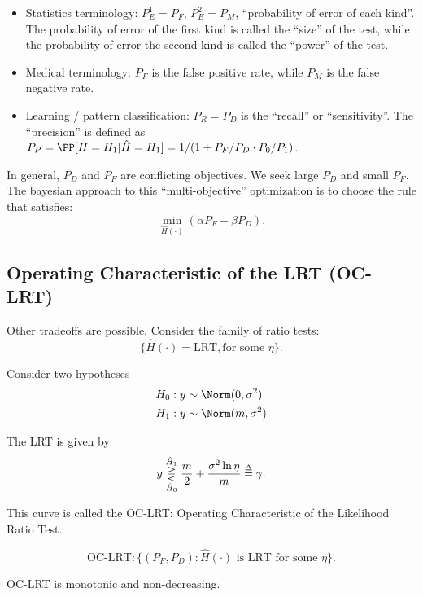 \begin{itemize}
	\item Statistics terminology: $P_E^1 = P_F$, $P_E^2 = P_M$, ``probability of error of each kind''. The probability of error of the first kind is called the ``size'' of the test, while the probability of error the second kind is called the ``power'' of the test. 
	\item Medical terminology: $P_F$ is the false positive rate, while $P_M$ is the false negative rate. 
	\item Learning / pattern classification: $P_R = P_D$ is the ``recall'' or ``sensitivity''. The ``precision'' is defined as $P_P = \PP[H=H_1|\hat{H}=H_1] = 1 / (1 + P_F/P_D\cdot P_0/P_1)$. 
\end{itemize}

In general, $P_D$ and $P_F$ are conflicting objectives. We seek large $P_D$ and small $P_F$. The bayesian approach to this ``multi-objective'' optimization is to choose the rule that satisfies: 
\[\min_{\hat{H}(\cdot)}(\alpha P_F - \beta P_D).\]

\subsection{Operating Characteristic of the LRT (OC-LRT)}
Other tradeoffs are possible. Consider the family of ratio tests: 
\[\{\hat{H}(\cdot) = \text{LRT}, \text{for some }\eta\}.\] 

\begin{example}
\exlabel

Consider two hypotheses
\begin{align*}
	H_0 &: y\sim \Norm(0,\sigma^2) \\
	H_1 &: y\sim \Norm(m,\sigma^2)
\end{align*} 
\end{example}

The LRT is given by 
\[y \overunderset{\hat{H}_1}{\hat{H}_0}{\gtreqless} \frac{m}{2} + \frac{\sigma^2\ln \eta}{m} \overset{\Delta}{=}\gamma.\] 


This curve is called the \ac{OC-LRT}: Operating Characteristic of the Likelihood Ratio Test. 

\[\text{OC-LRT}: \{(P_F, P_D): \hat{H}(\cdot)\text{ is LRT for some }\eta\}.\] 

\begin{theorem}
\claimlabel

OC-LRT is monotonic and non-decreasing. 
\end{theorem}

